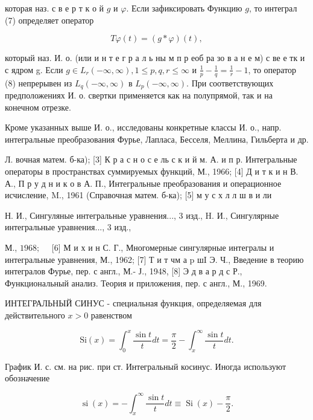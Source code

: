 \documentclass[10pt]{article}
\begin{document}
которая наз. с в е р т к о й $g$ и $\varphi$. Если зафиксировать Функцию $g$, то интеграл (7) определяет оператор



\[

T \varphi(t)=(g * \varphi)(t),

\]



который наз. И. о. (или и н т е г р а л ь ны м п р еоб ра зо в а н е м) с ве е тк и с ядром g. Если $g \in L_{r}(-\infty, \infty), 1 \leqslant p, q, r \leqslant \infty$ и $\frac{1}{p}-\frac{1}{q}=\frac{1}{r}-1$, то оператор (8) непрерывен из $L_{q}(-\infty, \infty)$ в $L_{p}(-\infty, \infty)$. При соответствующих предположениях И. о. свертки применяется как на полупрямой, так и на конечном отрезке.



Кроме указанных выше И. о., исследованы конкретные классы И. о., напр. интегральные преобразования Фурье, Лапласа, Бесселя, Меллина, Гильберта и др.



Л. вочная матем. б-ка); [3] К р а с н о с е ль с к и й м. А. и п р. Интегральные операторы в пространствах суммируемых функций, М., 1966; [4] Д и т к и н В. А., П р у д н и к о в А. П., Интегральные преобразования и операционное исчисление, M., 1961 (Справочная матем. б-ка); [5] м у с х л л ш в и ли

Н. И., Сингуляные интегральные уравнения..., 3 изд., H. И., Сингулярные интегральные уравнения..., 3 изд.,

М., $1968 ; \quad$ [6] М и х и н С. Г., Многомерные сингулярные интегралы и интегральные уравнения, М., 1962; [7] Т и т чм а p шI Э. Ч., Введение в теорию интегралов Фурье, пер. с англ., М.- Ј., 1948, [8] Э д в а р д с Р., Функциональный анализ. Теория и приложения, пер. с англ., М., 1969.



ИНТЕГРАЛЬНЫЙ СИНУС - специальная функция, определяемая для действительного $x>0$ равенством



\[

\mathrm{Si}(x)=\int_{0}^{x} \frac{\sin t}{t} d t=\frac{\pi}{2}-\int_{x}^{\infty} \frac{\sin t}{t} d t .

\]



График И. с. см. на рис. при ст. Интегральный косинус. Иногда используют обозначение



\[

\operatorname{si}(x)=-\int_{x}^{\infty} \frac{\sin t}{t} d t \equiv \operatorname{Si}(x)-\frac{\pi}{2} .

\]
\end{document}
